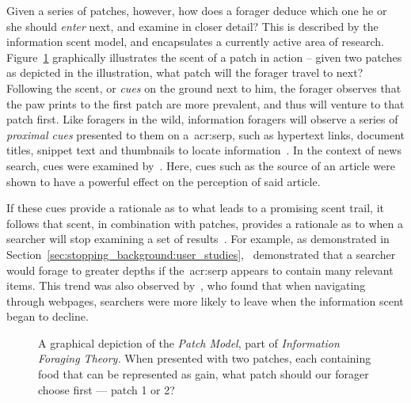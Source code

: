 Given a series of patches, however, how does a forager deduce which one he or she should \emph{enter} next, and examine in closer detail? This is described by the information scent model, and encapsulates a currently active area of research. Figure~\ref{fig:patch_model} graphically illustrates the scent of a patch in action -- given two patches as depicted in the illustration, what patch will the forager travel to next? Following the scent, or \emph{cues} on the ground next to him, the forager observes that the paw prints to the first patch are more prevalent, and thus will venture to that patch first. Like foragers in the wild, information foragers will observe a series of \emph{proximal cues} presented to them on a~\gls{acr:serp}, such as hypertext links, document titles, snippet text and thumbnails to locate information~\citep{pirolli1995ift, pirolli1999ift, chi2001information_scent, oltston2003scenttrails, pirolli2007ift}. In the context of news search, cues were examined by~\cite{sundar2007news_scent}. Here, cues such as the source of an article were shown to have a powerful effect on the perception of said article.

If these cues provide a rationale as to what leads to a promising scent trail, it follows that scent, in combination with patches, provides a rationale as to when a searcher will stop examining a set of results~\citep{pirolli1999ift, wu2012dc, wu2014information_scent}. For example, as demonstrated in Section~\ref{sec:stopping_background:user_studies},~\cite{wu2014information_scent} demonstrated that a searcher would forage to greater depths if the~\gls{acr:serp} appears to contain many relevant items. This trend was also observed by~\cite{card2001scent_graphs}, who found that when navigating through webpages, searchers were more likely to leave when the information scent began to decline.

\begin{figure}[t!]
    \centering
    \caption[The Patch Model]{A graphical depiction of the \emph{Patch Model}, part of \emph{Information Foraging Theory.} When presented with two patches, each containing food that can be represented as gain, what patch should our forager choose first — patch 1 or 2?}
    \label{fig:patch_model}
\end{figure}

